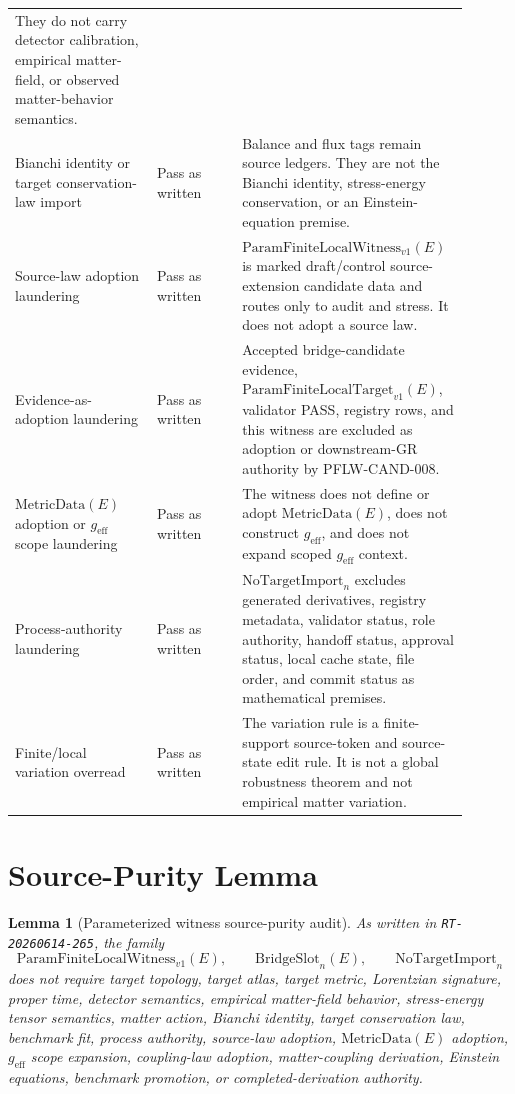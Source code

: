 \documentclass[11pt]{article}
\newcommand{\MetricData}{\mathrm{MetricData}}
\newcommand{\geff}{g_{\mathrm{eff}}}
\newcommand{\PFLFW}{\mathrm{ParamFiniteLocalWitness}_{v1}}
\newcommand{\PFLFT}{\mathrm{ParamFiniteLocalTarget}_{v1}}
\newcommand{\BridgeSlot}{\mathrm{BridgeSlot}}
\newcommand{\NoTargetImport}{\mathrm{NoTargetImport}}
\newtheorem{lemma}{Lemma}
\begin{document}
\begin{longtable}{p{0.30\linewidth}p{0.18\linewidth}p{0.42\linewidth}}
They do not carry detector calibration, empirical matter-field, or observed
matter-behavior semantics. \\
\addlinespace
Bianchi identity or target conservation-law import &
Pass as written &
Balance and flux tags remain source ledgers. They are not the Bianchi
identity, stress-energy conservation, or an Einstein-equation premise. \\
\addlinespace
Source-law adoption laundering &
Pass as written &
\(\PFLFW(E)\) is marked draft/control source-extension candidate data and
routes only to audit and stress. It does not adopt a source law. \\
\addlinespace
Evidence-as-adoption laundering &
Pass as written &
Accepted bridge-candidate evidence, \(\PFLFT(E)\), validator PASS, registry
rows, and this witness are excluded as adoption or downstream-GR authority by
PFLW-CAND-008. \\
\addlinespace
\(\MetricData(E)\) adoption or \(\geff\) scope laundering &
Pass as written &
The witness does not define or adopt \(\MetricData(E)\), does not construct
\(\geff\), and does not expand scoped \(\geff\) context. \\
\addlinespace
Process-authority laundering &
Pass as written &
\(\NoTargetImport_n\) excludes generated derivatives, registry metadata,
validator status, role authority, handoff status, approval status, local
cache state, file order, and commit status as mathematical premises. \\
\addlinespace
Finite/local variation overread &
Pass as written &
The variation rule is a finite-support source-token and source-state edit
rule. It is not a global robustness theorem and not empirical matter
variation. \\
\bottomrule
\end{longtable}

\section{Source-Purity Lemma}

\begin{lemma}[Parameterized witness source-purity audit]
As written in \texttt{RT-20260614-265}, the family
\[
  \PFLFW(E),\qquad \BridgeSlot_n(E),\qquad \NoTargetImport_n
\]
does not require target topology, target atlas, target metric, Lorentzian
signature, proper time, detector semantics, empirical matter-field behavior,
stress-energy tensor semantics, matter action, Bianchi identity, target
conservation law, benchmark fit, process authority, source-law adoption,
\(\MetricData(E)\) adoption, \(\geff\) scope expansion, coupling-law
adoption, matter-coupling derivation, Einstein equations, benchmark
promotion, or completed-derivation authority.
\end{lemma}
\end{document}
